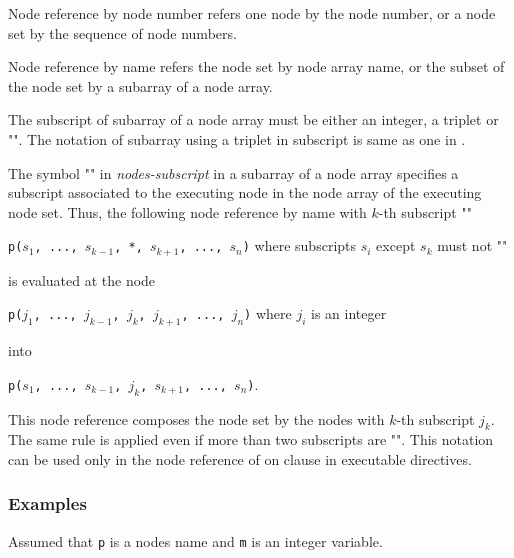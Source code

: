 Node reference by node number refers one node
by the node number, or a node set by the sequence of node numbers.

Node reference by name refers the node set by node array name, or the
subset of the node set by a subarray of a node array.  

The subscript
of subarray of a node array must be either an integer, a triplet or
"{\tt *}". The notation of subarray using a triplet in subscript is same as
one in \Fort. 

The symbol "{\tt *}" in {\it nodes-subscript} in a subarray of a
node array specifies a subscript associated to the executing node in
the node array of the executing node set. Thus, the following node
reference by name with $k$-th subscript "{\tt *}"  
\begin{center}
{\tt p($s_1$, ..., $s_{k-1}$, *, $s_{k+1}$, ..., $s_n$)} where
subscripts $s_i$ except $s_k$ must not "{\tt *}" 
\end{center}
is evaluated at the node 
\begin{center}
{\tt p($j_1$, ..., $j_{k-1}$, $j_k$, $j_{k+1}$, ..., $j_n$)} 
where $j_i$ is an integer 
\end{center}
into
\begin{center}
{\tt p($s_1$, ..., $s_{k-1}$, $j_k$, $s_{k+1}$, ..., $s_n$)}.
\end{center}

This node reference composes the node set by the nodes with $k$-th
subscript $j_k$. The same rule is applied even if more than two subscripts are
"{\tt *}". This notation can be used only in the node reference of on clause
in executable directives. 

\subsubsection*{Examples}

Assumed that {\tt p} is a nodes name and {\tt m} is an integer variable. 

